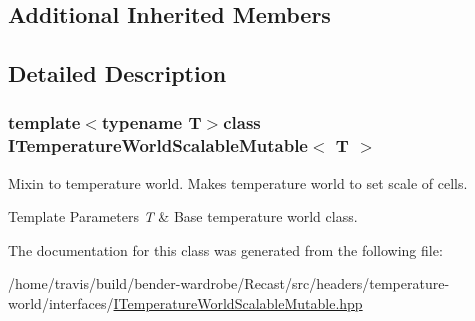 \subsection*{Additional Inherited Members}


\subsection{Detailed Description}
\subsubsection*{template$<$typename T$>$class I\-Temperature\-World\-Scalable\-Mutable$<$ T $>$}

Mixin to temperature world. Makes temperature world to set scale of cells.


\begin{DoxyTemplParams}{Template Parameters}
{\em T} & Base temperature world class. \\
\hline
\end{DoxyTemplParams}


The documentation for this class was generated from the following file\-:\begin{DoxyCompactItemize}
\item 
/home/travis/build/bender-\/wardrobe/\-Recast/src/headers/temperature-\/world/interfaces/\hyperlink{_i_temperature_world_scalable_mutable_8hpp}{I\-Temperature\-World\-Scalable\-Mutable.\-hpp}\end{DoxyCompactItemize}
